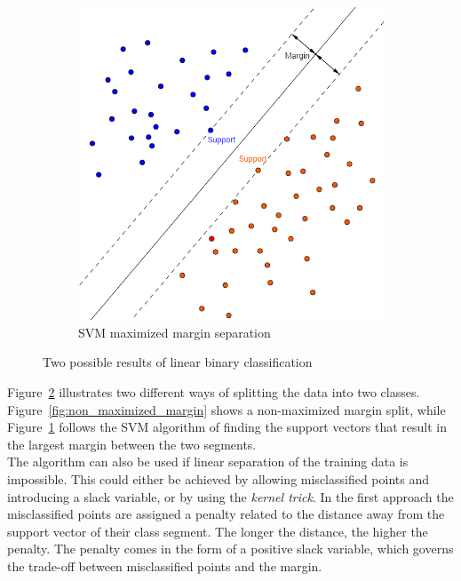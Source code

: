 \begin{figure}[t]
\begin{subfigure}[b]{0.45\textwidth}
        \includegraphics[width=\textwidth]{./figs/svm_classification_illustration}
        \caption{SVM maximized margin separation}
        \label{fig:svm_maximized_margin}
    \end{subfigure}
    \caption{Two possible results of linear binary classification}
    \label{fig:classification_comparison}
\end{figure}

Figure~\ref{fig:classification_comparison} illustrates two different ways of splitting the data into two classes. Figure~\ref{fig:non_maximized_margin} shows a non-maximized margin split, while Figure~\ref{fig:svm_maximized_margin} follows the SVM algorithm of finding the support vectors that result in the largest margin between the two segments. \\

The algorithm can also be used if linear separation of the training data is impossible. This could either be achieved by allowing misclassified points and introducing a slack variable, or by using the \textit{kernel trick}. In the first approach the misclassified points are assigned a penalty related to the distance away from the support vector of their class segment. The longer the distance, the higher the penalty. The penalty comes in the form of a positive slack variable, which governs the trade-off between misclassified points and the margin. \\

